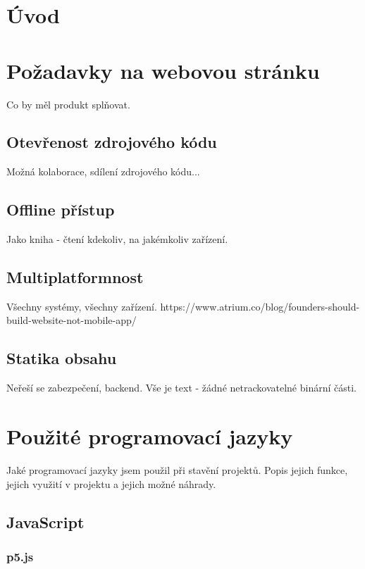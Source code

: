 \documentclass[a4paper, 12pt]{article}
\begin{document}
  \renewcommand{\contentsname}{Obsah}
  \tableofcontents

  \newpage

  \section{Úvod}

  \section{Požadavky na webovou stránku}
  Co by měl produkt splňovat.

  \subsection{Otevřenost zdrojového kódu}
  Možná kolaborace, sdílení zdrojového kódu...

  \subsection{Offline přístup}
  Jako kniha - čtení kdekoliv, na jakémkoliv zařízení.

  \subsection{Multiplatformnost}
  Všechny systémy, všechny zařízení.
  https://www.atrium.co/blog/founders-should-build-website-not-mobile-app/

  \subsection{Statika obsahu}
  Neřeší se zabezpečení, backend.
  Vše je text - žádné netrackovatelné binární části.

  \section{Použité programovací jazyky}
  Jaké programovací jazyky jsem použil při stavění projektů.
  Popis jejich funkce, jejich využití v projektu a jejich možné náhrady.

  \subsection{JavaScript}

  \subsubsection{p5.js}
\end{document}
